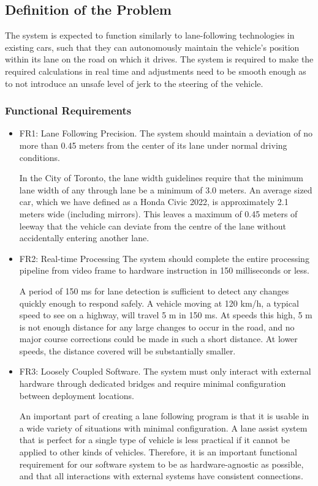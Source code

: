 \documentclass[titlepage,draft]{article}
\begin{document}
\subsection{Definition of the Problem}
The system is expected to function similarly to lane-following technologies in existing cars, such that they can autonomously maintain the vehicle's position within its lane on the road on which it drives. The system is required to make the required calculations in real time and adjustments need to be smooth enough as to not introduce an unsafe level of jerk to the steering of the vehicle.


\subsubsection{Functional Requirements}
\begin{itemize}

	\item FR1: Lane Following Precision. The system should maintain a deviation of no more than 0.45 meters from the center of its lane under normal driving conditions.

	      In the City of Toronto, the lane width guidelines require that the minimum lane width of any through lane be a minimum
	      of 3.0 meters. \cite{LaneWidthsGuideline}
	      An average sized car, which we have defined as a Honda Civic 2022, is approximately 2.1 meters wide (including
	      mirrors). \cite{HondaCivicSpecs}
	      This leaves a maximum of 0.45 meters of leeway that the vehicle can deviate from the centre of the lane without
	      accidentally entering another lane.

	\item FR2: Real-time Processing
	      The system should complete the entire processing pipeline from video frame to hardware instruction in 150 milliseconds or less.

		  A period of 150 ms for lane detection is sufficient to detect any changes quickly enough to respond safely. A vehicle moving at 120 km/h, a typical speed to see on a highway, will travel 5 m in 150 ms. At speeds this high, 5 m is not enough distance for any large changes to occur in the road, and no major course corrections could be made in such a short distance. At lower speeds, the distance covered will be substantially smaller. 


	\item FR3: Loosely Coupled Software. The system must only interact with external hardware through dedicated bridges and require minimal configuration between deployment locations.

	      An important part of creating a lane following program is that it is usable in a wide variety of situations with minimal configuration. A lane assist system that is perfect for a single type of vehicle is less practical if it cannot be applied to other kinds of vehicles. Therefore, it is an important functional requirement for our software system to be as hardware-agnostic as possible, and that all interactions with external systems have consistent connections.

\end{itemize}
\end{document}
